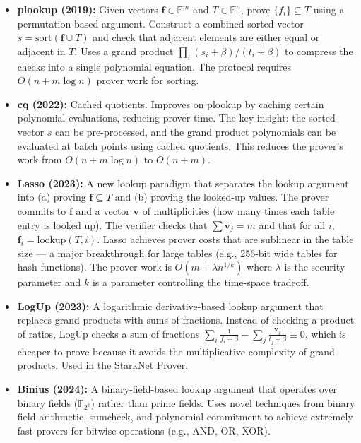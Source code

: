 \begin{itemize}
\item \textbf{plookup (2019):} Given vectors $\mathbf{f} \in \mathbb{F}^m$ and $T \in \mathbb{F}^n$, prove $\{f_i\} \subseteq T$ using a permutation-based argument. Construct a combined sorted vector $s = \text{sort}(\mathbf{f} \cup T)$ and check that adjacent elements are either equal or adjacent in $T$. Uses a grand product $\prod_i (s_i + \beta) / (t_i + \beta)$ to compress the checks into a single polynomial equation. The protocol requires $O(n + m \log n)$ prover work for sorting.

\item \textbf{cq (2022):} Cached quotients. Improves on plookup by caching certain polynomial evaluations, reducing prover time. The key insight: the sorted vector $s$ can be pre-processed, and the grand product polynomials can be evaluated at batch points using cached quotients. This reduces the prover's work from $O(n + m \log n)$ to $O(n + m)$.

\item \textbf{Lasso (2023):} A new lookup paradigm that separates the lookup argument into (a) proving $\mathbf{f} \subseteq T$ and (b) proving the looked-up values. The prover commits to $\mathbf{f}$ and a vector $\mathbf{v}$ of multiplicities (how many times each table entry is looked up). The verifier checks that $\sum \mathbf{v}_j = m$ and that for all $i$, $\mathbf{f}_i = \text{lookup}(T, i)$. Lasso achieves prover costs that are sublinear in the table size --- a major breakthrough for large tables (e.g., 256-bit wide tables for hash functions). The prover work is $O(m + \lambda n^{1/k})$ where $\lambda$ is the security parameter and $k$ is a parameter controlling the time-space tradeoff.

\item \textbf{LogUp (2023):} A logarithmic derivative-based lookup argument that replaces grand products with sums of fractions. Instead of checking a product of ratios, LogUp checks a sum of fractions $\sum_i \frac{1}{f_i + \beta} - \sum_j \frac{\mathbf{v}_j}{t_j + \beta} \equiv 0$, which is cheaper to prove because it avoids the multiplicative complexity of grand products. Used in the StarkNet Prover.

\item \textbf{Binius (2024):} A binary-field-based lookup argument that operates over binary fields ($\mathbb{F}_{2^k}$) rather than prime fields. Uses novel techniques from binary field arithmetic, sumcheck, and polynomial commitment to achieve extremely fast provers for bitwise operations (e.g., AND, OR, XOR).
\end{itemize}

